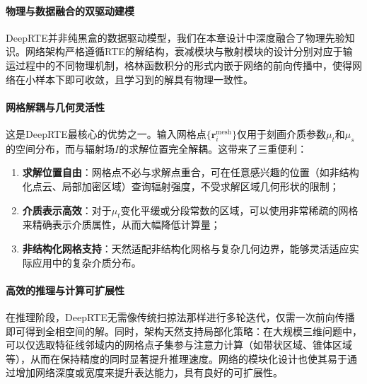 \paragraph{物理与数据融合的双驱动建模}
DeepRTE并非纯黑盒的数据驱动模型，我们在本章设计中深度融合了物理先验知识。网络架构严格遵循RTE的解结构，衰减模块与散射模块的设计分别对应于输运过程中的不同物理机制，格林函数积分的形式内嵌于网络的前向传播中，使得网络在小样本下即可收敛，且学习到的解具有物理一致性。
\paragraph{网格解耦与几何灵活性}
这是DeepRTE最核心的优势之一。输入网格点$\{\boldsymbol{r}^{\text{mesh}}_i\}$仅用于刻画介质参数$\mu_t$和$\mu_s$的空间分布，而与辐射场$I$的求解位置完全解耦。这带来了三重便利：
\begin{enumerate}
    \item \textbf{求解位置自由}：网格点不必与求解点重合，可在任意感兴趣的位置（如非结构化点云、局部加密区域）查询辐射强度，不受求解区域几何形状的限制；
    \item \textbf{介质表示高效}：对于$\mu_t$变化平缓或分段常数的区域，可以使用非常稀疏的网格来精确表示介质属性，从而大幅降低计算量；
    \item \textbf{非结构化网格支持}：天然适配非结构化网格与复杂几何边界，能够灵活适应实际应用中的复杂介质分布。
\end{enumerate}
\paragraph{高效的推理与计算可扩展性}
在推理阶段，DeepRTE无需像传统扫掠法那样进行多轮迭代，仅需一次前向传播即可得到全相空间的解。同时，架构天然支持局部化策略：在大规模三维问题中，可以仅选取特征线邻域内的网格点子集参与注意力计算（如带状区域、锥体区域等），从而在保持精度的同时显著提升推理速度。网络的模块化设计也使其易于通过增加网络深度或宽度来提升表达能力，具有良好的可扩展性。


